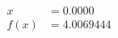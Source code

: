\documentclass[preview]{standalone}
\begin{document}
\begin{align*}
x &= 0.0000\\f(x) &= 4.0069444
\end{align*}
\end{document}
